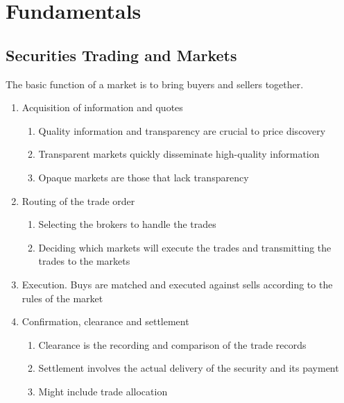 \section{Fundamentals}

\subsection{Securities Trading and Markets}

The basic function of a market is to bring buyers and sellers together.

\begin{process}
\begin{enumerate}[label=\roman*.]
\setlength{\itemsep}{0pt}
\item Acquisition of information and quotes
\begin{enumerate}[label=\arabic*.]
\setlength{\itemsep}{0pt}
\item Quality information and transparency are crucial to price discovery
\item Transparent markets quickly disseminate high-quality information
\item Opaque markets are those that lack transparency
\end{enumerate}
\item Routing of the trade order
\begin{enumerate}[label=\arabic*.]
\setlength{\itemsep}{0pt}
\item Selecting the brokers to handle the trades
\item Deciding which markets will execute the trades and transmitting the trades to the markets
\end{enumerate}
\item Execution. Buys are matched and executed against sells according to the rules of the market
\item Confirmation, clearance and settlement
\begin{enumerate}[label=\arabic*.]
\setlength{\itemsep}{0pt}
\item Clearance is the recording and comparison of the trade records
\item Settlement involves the actual delivery of the security and its payment
\item Might include trade allocation
\end{enumerate}
\end{enumerate}
\end{process}


